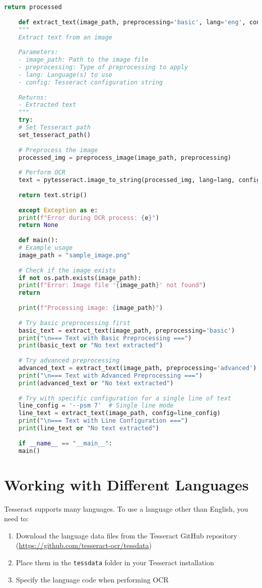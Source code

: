 \begin{lstlisting}[language=Python]
	return processed
	
	def extract_text(image_path, preprocessing='basic', lang='eng', config=''):
	"""
	Extract text from an image
	
	Parameters:
	- image_path: Path to the image file
	- preprocessing: Type of preprocessing to apply
	- lang: Language(s) to use
	- config: Tesseract configuration string
	
	Returns:
	- Extracted text
	"""
	try:
	# Set Tesseract path
	set_tesseract_path()
	
	# Preprocess the image
	processed_img = preprocess_image(image_path, preprocessing)
	
	# Perform OCR
	text = pytesseract.image_to_string(processed_img, lang=lang, config=config)
	
	return text.strip()
	
	except Exception as e:
	print(f"Error during OCR process: {e}")
	return None
	
	def main():
	# Example usage
	image_path = "sample_image.png"
	
	# Check if the image exists
	if not os.path.exists(image_path):
	print(f"Error: Image file '{image_path}' not found")
	return
	
	print(f"Processing image: {image_path}")
	
	# Try basic preprocessing first
	basic_text = extract_text(image_path, preprocessing='basic')
	print("\n=== Text with Basic Preprocessing ===")
	print(basic_text or "No text extracted")
	
	# Try advanced preprocessing
	advanced_text = extract_text(image_path, preprocessing='advanced')
	print("\n=== Text with Advanced Preprocessing ===")
	print(advanced_text or "No text extracted")
	
	# Try with specific configuration for a single line of text
	line_config = '--psm 7'  # Single line mode
	line_text = extract_text(image_path, config=line_config)
	print("\n=== Text with Line Configuration ===")
	print(line_text or "No text extracted")
	
	if __name__ == "__main__":
	main()
\end{lstlisting}

\section{Working with Different Languages}
Tesseract supports many languages. To use a language other than English, you need to:
\begin{enumerate}
	\item Download the language data files from the Tesseract GitHub repository (\url{https://github.com/tesseract-ocr/tessdata})
	\item Place them in the \texttt{tessdata} folder in your Tesseract installation 
	\item Specify the language code when performing OCR
\end{enumerate}

